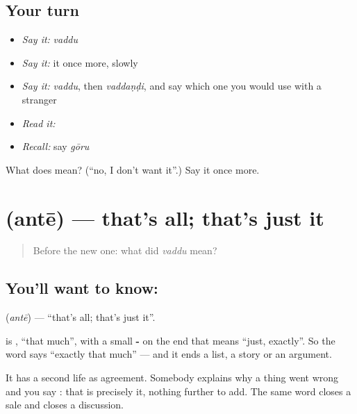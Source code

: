 \subsection*{Your turn}
\begin{itemize}
\raggedright
  \item \emph{Say it:} \emph{vaddu}
  \item \emph{Say it:} it once more, slowly
  \item \emph{Say it:} \emph{vaddu}, then \emph{vaddaṇḍi}, and say which one you would use with a stranger
  \item \emph{Read it:} \textbf{}
  \item \emph{Recall:} say \emph{gōru}
\end{itemize}

\begin{tcolorbox}[breakable,colback=teal!4,colframe=teal!35!black,title={Before you move on}]
What does  mean? (\textquotedblleft{}no, I don't want it\textquotedblright{}.) Say it once more.
\end{tcolorbox}
\section[\texorpdfstring{\te{అంతే} (antē)}{అంతే (antē)}]{ (antē) — that's all; that's just it}

\label{lesson:TE-C58-thats-all}



\begin{quote}
Before the new one: what did \emph{vaddu} mean?
\end{quote}

\subsection*{You'll want to know: }
\textbf{} (\emph{antē}) — \textquotedblleft{}that's all; that's just it\textquotedblright{}.

 is , \textquotedblleft{}that much\textquotedblright{}, with a small \textbf{-} on the end that means \textquotedblleft{}just, exactly\textquotedblright{}. So the word says \textquotedblleft{}exactly that much\textquotedblright{} — and it ends a list, a story or an argument.

It has a second life as agreement. Somebody explains why a thing went wrong and you say : that is precisely it, nothing further to add. The same word closes a sale and closes a discussion.

